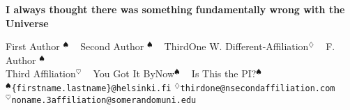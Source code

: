 \documentclass[portrait]{article}
\begin{document}
\printheader

\begin{center}
\textbf{\bf\veryHuge\color{NavyBlue}I always thought there was something fundamentally wrong with the Universe \\[1.5cm]}


\huge     First Author $^{\spadesuit}$ ~
    Second Author $^{\spadesuit}$ ~ 
    ThirdOne W. Different-Affiliation$^{\diamondsuit}$ ~ 
    F. Author $^{\spadesuit}$ \\[0.2cm] 
    Third Affiliation$^{\heartsuit}$ ~ 
    You Got It ByNow$^{\spadesuit}$ ~
    Is This the PI?$^{\spadesuit}$ \\[0.2cm]
\Large    $^{\spadesuit}$\texttt{\{firstname.lastname\}@helsinki.fi} \qquad $^{\diamondsuit}$\texttt{thirdone@nsecondaffiliation.com} \\
\Large   $^{\heartsuit}$\texttt{noname.3affiliation@somerandomuni.edu} 
 

 \end{center}

\vspace{2cm}


  



 \Large
\end{document}
